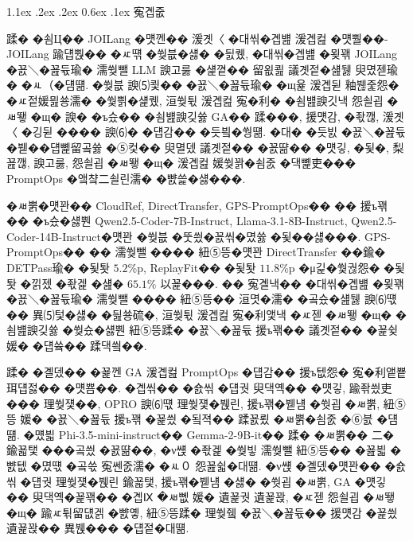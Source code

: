 \documentclass[10pt,twocolumn]{article}
\makeatletter
\renewcommand{\section}{\@startsection{section}{1}{\z@}%
{1.1ex \@plus .2ex \@minus .2ex}%
{0.6ex \@plus .1ex}%
{\normalfont\normalsize\bfseries}}
\makeatother
\begin{document}
\FloatBarrier

\section{寃곕줎}

蹂� �쇰Ц�� JOILang �먯껜�� 湲곗〈 �대씪�곕뱶 湲곕컲 �먯뿰��-JOILang 踰덉뿭�� �ㅼ떆 �쒖븞�섏� �딄퀬, �대씪�곕뱶 �묒꽦 JOILang �꾨＼�꾪듃瑜� 濡쒖뺄 LLM 諛고룷 �섍꼍�� 留욊쾶 議곗젙�섎뒗 臾몄젣瑜� �ㅻ（�덈떎. �쒖븞 諛⑸쾿�� �꾨＼�꾪듃瑜� �щ윭 湲곕뒫 釉붾줉怨� �ㅼ젙媛믪쑝濡� �쒗쁽�섍퀬, 洹쒖튃 湲곕컲 寃�利� �쇰뱶諛깃낵 怨쇨굅 �ㅽ뙣 �щ� 諛� �ъ슜�� �쇰뱶諛깆쓣 GA�� 蹂���, 援먯감, �좏깮, 湲곗〈 �깅뒫 ���� 諛⑹� �덉감�� �듯빀�쒕떎. �대� �듯빐 �꾨＼�꾪듃 �붿��덉뼱留곸쓣 �⑤컻�� 臾멸뎄 議곗젙�� �꾨땲�� �먯깋, �됯�, 梨꾪깮, 諛고룷, 怨쇨굅 �ㅽ뙣 �щ� 湲곕컲 媛쒖꽑�쇰줈 �댁뼱吏��� PromptOps �앸챸二쇨린濡� �뺤쓽�섏���.

�ㅽ뿕�먯꽌�� CloudRef, DirectTransfer, GPS-PromptOps�� �� 援ъ꽦�� �ъ슜�섏뿬 Qwen2.5-Coder-7B-Instruct, Llama-3.1-8B-Instruct, Qwen2.5-Coder-14B-Instruct�먯꽌 �쒖븞 �뚯씠�꾨씪�몄쓣 �됯��섏���. GPS-PromptOps�� �� 濡쒖뺄 ���� 紐⑤뜽�먯꽌 DirectTransfer ��鍮� DETPass瑜� �됯퇏 $5.2$\%p, ReplayFit�� �됯퇏 $11.8$\%p �μ긽�쒗궎怨� �됯퇏 �낅젰 �좏겙 �섎� $65.1\%$ 以꾩���. �� 寃곌낵�� �대씪�곕뱶 �묒꽦 �꾨＼�꾪듃瑜� 濡쒖뺄 ���� 紐⑤뜽�� 洹몃�濡� �곸슜�섎뒗 諛⑹떇�� 異⑸텇�섏� �딆쑝硫�, 洹쒖튃 湲곕컲 寃�利앷낵 �ㅼ젣 �ㅽ뙣 �щ� �쇰뱶諛깆쓣 �쒖슜�섏뿬 紐⑤뜽蹂� �꾨＼�꾪듃 援ъ꽦�� 議곗젙�� �꾩슂媛� �덉쓬�� 蹂댁씤��.

蹂� �곌뎄�� �꾩껜 GA 湲곕컲 PromptOps �덉감�� 援ъ텞怨� 寃�利앹뿉 珥덉젏�� �먯뿀��. �곕씪�� �숈씪 �덉궛 臾댁옉�� �먯깋, 踰좎씠吏��� 理쒖쟻��, OPRO 諛⑹떇 理쒖쟻�붽린, 援ъ꽦�붿냼 �쒓굅 �ㅽ뿕, 紐⑤뜽 媛� �꾨＼�꾪듃 援ъ꽦 �꾩씠 �됰젹�� 蹂꾨룄 �ㅽ뿕�쇰줈 �⑥븘 �덈떎. �먰븳 Phi-3.5-mini-instruct�� Gemma-2-9B-it�� 蹂� �ㅽ뿕�� 二� 鍮꾧탳 ���곸씠 �꾨땲��, �ν썑 �좏겙 �쒖빟 濡쒖뺄 紐⑤뜽�� �꾪븳 �뺤텞 �몄떇 �곸쓳 寃쎈줈濡� �ㅻ０ 怨꾪쉷�대떎. �ν썑 �곌뎄�먯꽌�� �숈씪 �덉궛 理쒖쟻�붽린 鍮꾧탳, 援ъ꽦�붿냼 �섏� �쒓굅 �ㅽ뿕, GA �먯깋�� 臾댁옉�꾩꽦�� �곕Ⅸ �ㅽ뻾 媛� 遺꾩궛 遺꾩꽍, �ㅼ젣 怨쇨굅 �ㅽ뙣 �щ� 踰ㅼ튂留덊겕 �뺤옣, 紐⑤뜽蹂� 理쒖쥌 �꾨＼�꾪듃�� 援먯감 �꾩씠 遺꾩꽍�� 異붽��� �덉젙�대떎.

\FloatBarrier



\end{document}
